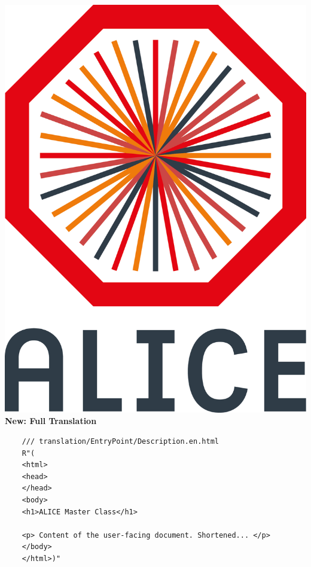 \documentclass[aspectratio=169,14pt,dvipsnames]{beamer}
\begin{document}
\begin{frame}[fragile]{\includegraphics[height=0.07\textheight]{2012-Jul-04-4_Color_Logo_CB.png} \hspace{0.2cm}\textbf{New: Full Translation}}
  \begin{verbatim}
    /// translation/EntryPoint/Description.en.html
    R"(
    <html>
    <head>
    </head>
    <body>
    <h1>ALICE Master Class</h1>

    <p> Content of the user-facing document. Shortened... </p>
    </body>
    </html>)"
  \end{verbatim}
\end{frame}
\end{document}
